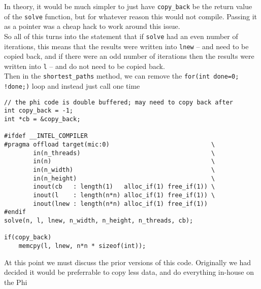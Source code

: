 \documentclass[11pt]{article}
\begin{document}
\noindent In theory, it would be much simpler to just have \texttt{copy\_back} be the return value of the \texttt{solve} function, but for whatever reason this would not compile.  Passing it as a pointer was a cheap hack to work around this issue.\\

\noindent So all of this turns into the statement that if \texttt{solve} had an even number of iterations, this means that the results were written into \texttt{lnew} -- and need to be copied back, and if there were an odd number of iterations then the results were written into \texttt{l} -- and do not need to be copied back.\\

\noindent Then in the \texttt{shortest\_paths} method, we can remove the \texttt{for(int done=0; !done;)} loop and instead just call one time

\begin{lstlisting}
// the phi code is double buffered; may need to copy back after
int copy_back = -1;
int *cb = &copy_back;

#ifdef __INTEL_COMPILER
#pragma offload target(mic:0)                            \
        in(n_threads)                                    \
        in(n)                                            \
        in(n_width)                                      \
        in(n_height)                                     \
        inout(cb   : length(1)   alloc_if(1) free_if(1)) \
        inout(l    : length(n*n) alloc_if(1) free_if(1)) \
        inout(lnew : length(n*n) alloc_if(1) free_if(1))
#endif
solve(n, l, lnew, n_width, n_height, n_threads, cb);

if(copy_back)
    memcpy(l, lnew, n*n * sizeof(int));
\end{lstlisting}

\noindent At this point we must discuss the prior versions of this code.  Originally we had decided it would be preferrable to copy less data, and do everything in-house on the Phi
\end{document}
